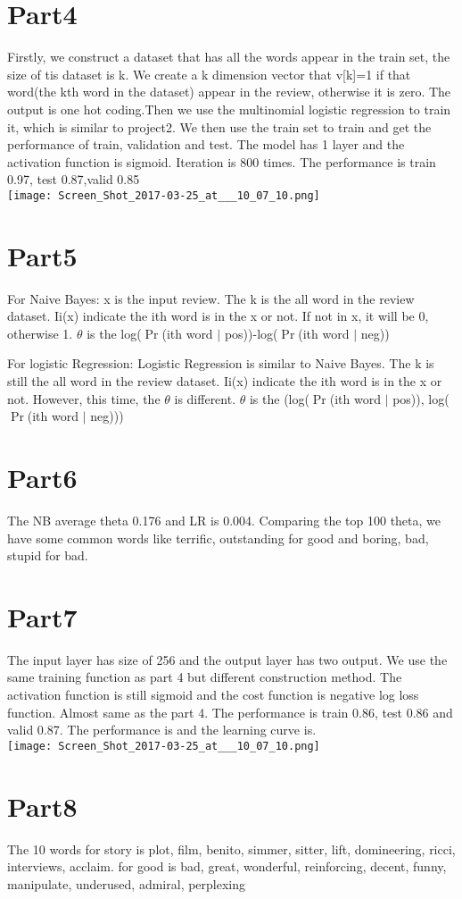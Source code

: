 \documentclass{article}
\begin{document}
\section{Part4}
Firstly, we construct a dataset that has all the words appear in the train set, the size of tis dataset is k. We create a k dimension vector that v[k]=1 if that word(the kth word in the dataset) appear in the review, otherwise it is zero. The output is one hot coding.Then we use the multinomial logistic regression to train it, which is similar to project2. We then use the train set to train and get the performance of train, validation and test. The model has 1 layer and the activation function is sigmoid. Iteration is 800 times. The performance is train 0.97, test 0.87,valid 0.85\\
\texttt{[image: Screen\_Shot\_2017-03-25\_at\_\_\_10\_07\_10.png]}\\
\section{Part5}
For Naive Bayes:
x is the input review. The k is the all word in the review dataset. Ii(x) indicate the ith word is in the x or not. If not in x, it will be 0, otherwise 1. $\theta$ is the  log($\Pr$(ith word $\mid$ pos))-log($\Pr$(ith word $\mid$ neg))

For logistic Regression:
Logistic Regression is similar to Naive Bayes. The k is still the all word in the review dataset. Ii(x) indicate the ith word is in the x or not. However, this time, the $\theta$ is different. $\theta$ is the  (log($\Pr$(ith word $\mid$ pos)), log($\Pr$(ith word $\mid$ neg)))

\section{Part6}

The NB average theta 0.176 and LR is 0.004. Comparing the top 100 theta, we have some common words like terrific, outstanding for good and boring, bad, stupid for bad. 
\section{Part7}
The input layer has size of 256 and the output layer has two output. We use the same training function as part 4 but different construction method. The activation function is still sigmoid and the cost function is negative log loss function. Almost same as the part 4. The performance is train 0.86, test 0.86 and valid 0.87. The performance is and the learning curve is.\\
\texttt{[image: Screen\_Shot\_2017-03-25\_at\_\_\_10\_07\_10.png]}\\
\section{Part8}
The 10 words for story is plot, film, benito, simmer, sitter, lift, domineering, ricci, interviews, acclaim.
for good is bad, great, wonderful, reinforcing, decent, funny, manipulate, underused, admiral, perplexing
\end{document}
